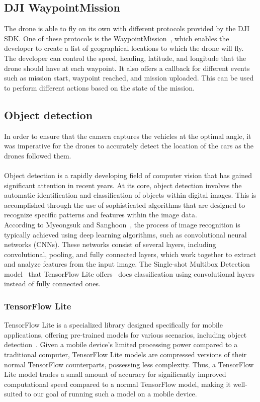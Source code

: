 \subsection{DJI WaypointMission}
The drone is able to fly on its own with different protocols provided by the DJI SDK. One of these protocols is the WaypointMission~\cite{WaypointMission}, which enables the developer to create a list of geographical locations to which the drone will fly. The developer can control the speed, heading, latitude, and longitude that the drone should have at each waypoint. It also offers a callback for different events such as mission start, waypoint reached, and mission uploaded. This can be used to perform different actions based on the state of the mission. 

\subsection{Object detection} \label{sec:Obj_detextion}
In order to ensure that the camera captures the vehicles at the optimal angle, it was imperative for the drones to accurately detect the location of the cars as the drones followed them. 
\\ \\
Object detection is a rapidly developing field of computer vision that has gained significant attention in recent years. At its core, object detection involves the automatic identification and classification of objects within digital images. This is accomplished through the use of sophisticated algorithms that are designed to recognize specific patterns and features within the image data.
\\

According to Myeongsuk and Sanghoon~\cite{Pak2018ARecognition}, the process of image recognition is typically achieved using deep learning algorithms, such as convolutional neural networks (CNNs). These networks consist of several layers, including convolutional, pooling, and fully connected layers, which work together to extract and analyze features from the input image. The Single-shot Multibox Detection model~\cite{ssd} that TensorFlow Lite offers~\cite{tflite} does classification using convolutional layers instead of fully connected ones. 

\subsubsection{TensorFlow Lite}
TensorFlow Lite is a specialized library designed specifically for mobile applications, offering pre-trained models for various scenarios, including object detection~\cite{tflite}. Given a mobile device's limited processing power compared to a traditional computer, TensorFlow Lite models are compressed versions of their normal TensorFlow counterparts, possessing less complexity.
Thus, a TensorFlow Lite model trades a small amount of accuracy for significantly improved computational speed compared to a normal TensorFlow model, making it well-suited to our goal of running such a model on a mobile device.

